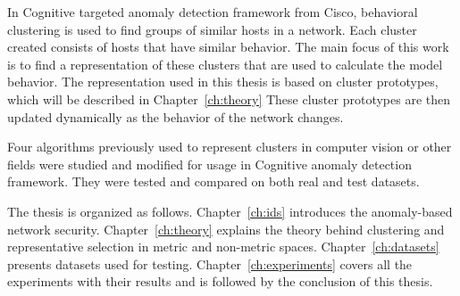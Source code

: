 \documentclass[thesis=B,english]{FITthesis}[2012/10/20]
\begin{document}
In Cognitive targeted anomaly detection framework from Cisco, behavioral clustering is used to find groups of similar hosts in a network.
Each cluster created consists of hosts that have similar behavior.
The main focus of this work is to find a representation of these clusters that are used to calculate the model behavior.
The representation used in this thesis is based on cluster prototypes, which will be described in Chapter~\ref{ch:theory}
These cluster prototypes are then updated dynamically as the behavior of the network changes.

Four algorithms previously used to represent clusters in computer vision or other fields were studied and modified for usage in Cognitive anomaly detection framework.
They were tested and compared on both real and test datasets.

The thesis is organized as follows.
Chapter~\ref{ch:ids} introduces the anomaly-based network security.
Chapter~\ref{ch:theory} explains the theory behind clustering and representative selection in metric and non-metric spaces.
Chapter~\ref{ch:datasets} presents datasets used for testing.
Chapter~\ref{ch:experiments} covers all the experiments with their results and is followed by the conclusion of this thesis.

%

%
\end{document}
